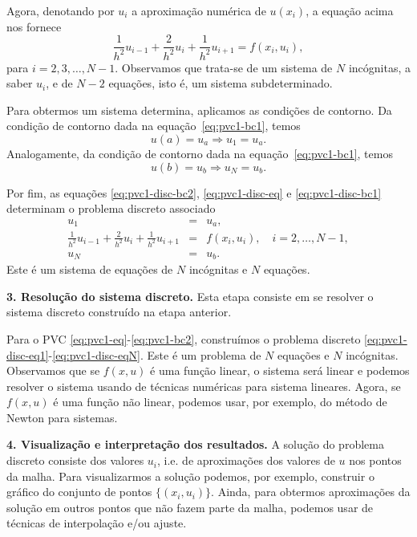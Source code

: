 Agora, denotando por $u_i$ a aproximação numérica de $u(x_i)$, a equação acima nos fornece
\begin{equation}\label{eq:pvc1-disc-eq}
\frac{1}{h^2}u_{i-1} + \frac{2}{h^2}u_i + \frac{1}{h^2}u_{i+1} = f(x_i, u_i),
\end{equation}
para $i=2, 3, \dotsc, N-1$. Observamos que trata-se de um sistema de $N$ incógnitas, a saber $u_i$, e de $N-2$ equações, isto é, um sistema subdeterminado.

Para obtermos um sistema determina, aplicamos as condições de contorno. Da condição de contorno dada na equação~\eqref{eq:pvc1-bc1}, temos
\begin{equation}\label{eq:pvc1-disc-bc1}
  u(a) = u_a\Rightarrow u_1 = u_a.
\end{equation}
Analogamente, da condição de contorno dada na equação~\eqref{eq:pvc1-bc1}, temos
\begin{equation}\label{eq:pvc1-disc-bc2}
  u(b) = u_b\Rightarrow u_N = u_b.
\end{equation}

Por fim, as equações \eqref{eq:pvc1-disc-bc2}, \eqref{eq:pvc1-disc-eq} e \eqref{eq:pvc1-disc-bc1} determinam o problema discreto associado
\begin{eqnarray}
  u_1 &=& u_a,\label{eq:pvc1-disc-eq1}\\
  \frac{1}{h^2}u_{i-1} + \frac{2}{h^2}u_i + \frac{1}{h^2}u_{i+1} &=& f(x_i, u_i),\quad i=2, \dotsc, N-1,\label{eq:pvc1-disc-eqi}\\
  u_N &=& u_b.\label{eq:pvc1-disc-eqN}
\end{eqnarray}
Este é um sistema de equações de $N$ incógnitas e $N$ equações.

{\bf 3. Resolução do sistema discreto.} Esta etapa consiste em se resolver o sistema discreto construído na etapa anterior. 

Para o PVC \eqref{eq:pvc1-eq}-\eqref{eq:pvc1-bc2}, construímos o problema discreto \eqref{eq:pvc1-disc-eq1}-\eqref{eq:pvc1-disc-eqN}. Este é um problema de $N$ equações e $N$ incógnitas. Observamos que se $f(x, u)$ é uma função linear, o sistema será linear e podemos resolver o sistema usando de técnicas numéricas para sistema lineares. Agora, se $f(x, u)$ é uma função não linear, podemos usar, por exemplo, do método de Newton para sistemas.

{\bf 4. Visualização e interpretação dos resultados.} A solução do problema discreto consiste dos valores $u_i$, i.e. de aproximações dos valores de $u$ nos pontos da malha. Para visualizarmos a solução podemos, por exemplo, construir o gráfico do conjunto de pontos $\{(x_i, u_i)\}$. Ainda, para obtermos aproximações da solução em outros pontos que não fazem parte da malha, podemos usar de técnicas de interpolação e/ou ajuste.

